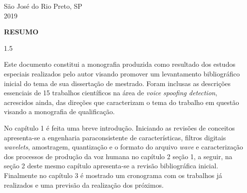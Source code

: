 \documentclass[a4paper,12pt,openright,oneside]{book}
\newenvironment{myenv}[1]
  {\begin{spacing}{#1}}
  {\end{spacing}}
\begin{document}
	\begin{center}
		São José do Rio Preto, SP  \\ \vspace{1.0pt}
		2019
	\end{center}


	\setlength{\parindent}{0pt}
	\newpage \thispagestyle{empty}
	\vspace{1.5cm}
	\fontsize{12}{\baselineskip} \selectfont

	\begin{center}
		{\huge{\textbf{RESUMO}}}
	\end{center}

	\begin{myenv}{1.5}
		\fontsize{12}{\baselineskip} \selectfont \onehalfspacing
		\par \null
		\par \null
		\par Este documento constitui a monografia produzida como resultado dos estudos especiais realizados pelo autor visando promover um levantamento bibliográfico inicial do tema de sua dissertação de mestrado. Foram inclusas as descrições essenciais de 15 trabalhos científicos na área de \textit{voice spoofing detection}, acrescidos ainda, das direções que caracterizam o tema do trabalho em questão visando a monografia de qualificação.
		
		\par No capítulo 1 é feita uma breve introdução. Iniciando as revisões de conceitos apresenta-se a engenharia paraconsistente de características, filtros digitais \textit{wavelets}, amostragem,  quantização e o formato do arquivo \textit{wave} e caracterização dos processos de produção da voz humana no capítulo 2 seção 1, a seguir, na seção 2 deste mesmo capítulo apresenta-se a revisão bibliográfica inicial. Finalmente no capítulo 3 é mostrado um cronograma com os trabalhos já realizados e uma previsão da realização dos próximos.
		
	\end{myenv}

	\cleardoublepage
	\listoffigures
	
	\cleardoublepage
	\listoftables
	\frontmatter
	
	\def\contentsname{Sumário} 
	\tableofcontents
	\cleardoublepage
	
\end{document}
